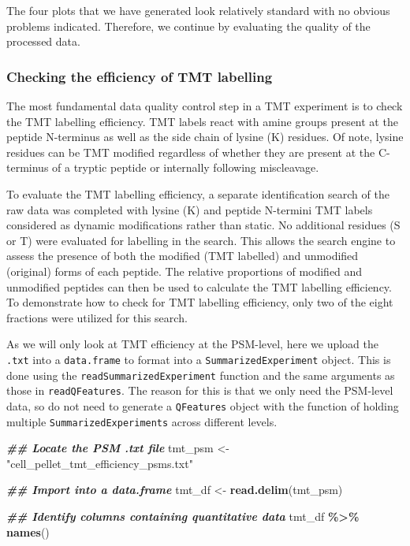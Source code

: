 \documentclass[9pt,a4paper,]{extarticle}
\newenvironment{Shaded}{\begin{snugshade}}{\end{snugshade}}
\newcommand{\DocumentationTok}[1]{\textcolor[rgb]{0.56,0.35,0.01}{\textbf{\textit{#1}}}}
\newcommand{\FunctionTok}[1]{\textcolor[rgb]{0.13,0.29,0.53}{\textbf{#1}}}
\newcommand{\NormalTok}[1]{#1}
\newcommand{\OtherTok}[1]{\textcolor[rgb]{0.56,0.35,0.01}{#1}}
\newcommand{\SpecialCharTok}[1]{\textcolor[rgb]{0.81,0.36,0.00}{\textbf{#1}}}
\newcommand{\StringTok}[1]{\textcolor[rgb]{0.31,0.60,0.02}{#1}}
\begin{document}
The four plots that we have generated look relatively standard with no obvious
problems indicated. Therefore, we continue by evaluating the quality of the
processed data.

\subsubsection{Checking the efficiency of TMT labelling}\label{checking-the-efficiency-of-tmt-labelling}

The most fundamental data quality control step in a TMT experiment is to check
the TMT labelling efficiency. TMT labels react with amine groups present at the
peptide N-terminus as well as the side chain of lysine (K) residues. Of note,
lysine residues can be TMT modified regardless of whether they are present at the
C-terminus of a tryptic peptide or internally following miscleavage.

To evaluate the TMT labelling efficiency, a separate identification search of the
raw data was completed with lysine (K) and peptide N-termini TMT labels
considered as dynamic modifications rather than static. No additional residues
(S or T) were evaluated for labelling in the search. This allows the search
engine to assess the presence of both the modified (TMT labelled) and unmodified
(original) forms of each peptide. The relative proportions of modified and
unmodified peptides can then be used to calculate the TMT labelling efficiency.
To demonstrate how to check for TMT labelling efficiency, only two of the eight
fractions were utilized for this search.

As we will only look at TMT efficiency at the PSM-level, here we upload the \texttt{.txt}
into a \texttt{data.frame} to format into a \texttt{SummarizedExperiment} object. This is done
using the \texttt{readSummarizedExperiment} function and the same arguments as those
in \texttt{readQFeatures}. The reason for this is that we only need the PSM-level data,
so do not need to generate a \texttt{QFeatures} object with the function of holding
multiple \texttt{SummarizedExperiments} across different levels.

\begin{Shaded}
\begin{Highlighting}[]
\DocumentationTok{\#\# Locate the PSM .txt file}
\NormalTok{tmt\_psm }\OtherTok{\textless{}{-}} \StringTok{"cell\_pellet\_tmt\_efficiency\_psms.txt"}

\DocumentationTok{\#\# Import into a data.frame}
\NormalTok{tmt\_df }\OtherTok{\textless{}{-}} \FunctionTok{read.delim}\NormalTok{(tmt\_psm)}

\DocumentationTok{\#\# Identify columns containing quantitative data}
\NormalTok{tmt\_df }\SpecialCharTok{\%\textgreater{}\%}
  \FunctionTok{names}\NormalTok{()}
\end{Highlighting}
\end{Shaded}
\end{document}
